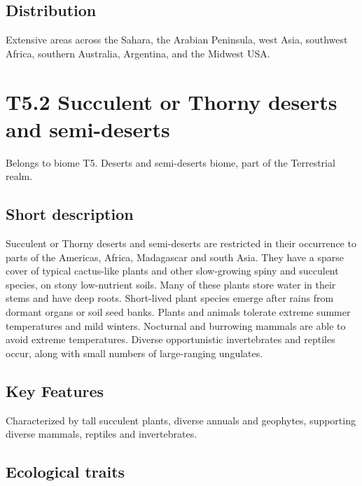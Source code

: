 \documentclass[
  letterpaper,
  DIV=11,
  numbers=noendperiod]{scrartcl}
\begin{document}
\subsection{Distribution}\label{distribution-88}

Extensive areas across the Sahara, the Arabian Peninsula, west Asia,
southwest Africa, southern Australia, Argentina, and the Midwest USA.

\section{T5.2 Succulent or Thorny deserts and
semi-deserts}\label{t5.2-succulent-or-thorny-deserts-and-semi-deserts}

Belongs to biome T5. Deserts and semi-deserts biome, part of the
Terrestrial realm.

\subsection{Short description}\label{short-description-89}

Succulent or Thorny deserts and semi-deserts are restricted in their
occurrence to parts of the Americas, Africa, Madagascar and south Asia.
They have a sparse cover of typical cactus-like plants and other
slow-growing spiny and succulent species, on stony low-nutrient soils.
Many of these plants store water in their stems and have deep roots.
Short-lived plant species emerge after rains from dormant organs or soil
seed banks. Plants and animals tolerate extreme summer temperatures and
mild winters. Nocturnal and burrowing mammals are able to avoid extreme
temperatures. Diverse opportunistic invertebrates and reptiles occur,
along with small numbers of large-ranging ungulates.

\subsection{Key Features}\label{key-features-89}

Characterized by tall succulent plants, diverse annuals and geophytes,
supporting diverse mammals, reptiles and invertebrates.

\subsection{Ecological traits}\label{ecological-traits-89}
\end{document}
